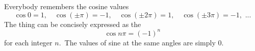 \documentclass[12pt]{article}
\theoremstyle{definition}
\begin{document}
Everybody remembers the cosine values
$$\cos 0 = 1,\quad \cos(\pm\pi) = -1,\quad \cos(\pm2\pi) = 1,\quad \cos(\pm3\pi) = -1,\,\,...$$
The thing can be concisely expressed as the 
$$\cos{n\pi} = (-1)^n$$
for each integer $n$.\, The values of sine at the same angles are simply 0.
\end{document}
